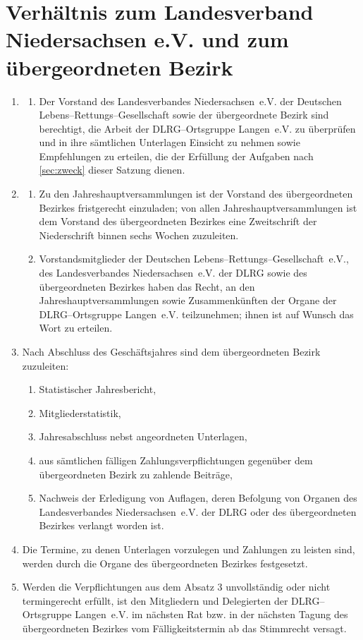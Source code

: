\documentclass[%
12pt, %
a4paper, %
headsepline, %
parskip, %
headings=normal, %
]{scrreprt}
\begin{document}
\section{Verhältnis zum Landesverband Niedersachsen e.V. und zum übergeordneten Bezirk}
\label{sec:verhaeltnis}
\begin{enumerate}
    \item \begin{enumerate}[noitemsep]
        \item Der Vorstand des Landesverbandes Niedersachsen~e.V. der Deutschen Lebens--Rettungs--Gesellschaft sowie der übergeordnete Bezirk sind berechtigt, die Arbeit der DLRG--Ortsgruppe Langen~e.V. zu überprüfen und in ihre sämtlichen Unterlagen Einsicht zu nehmen sowie Empfehlungen zu erteilen, die der Erfüllung der Aufgaben nach \ref{sec:zweck} dieser Satzung dienen.
      \end{enumerate}
    \item \begin{enumerate}[noitemsep]
        \item Zu den Jahreshauptversammlungen ist der Vorstand des übergeordneten Bezirkes fristgerecht einzuladen; von allen Jahreshauptversammlungen ist dem Vorstand des übergeordneten Bezirkes eine Zweitschrift der Niederschrift binnen sechs Wochen zuzuleiten.
        \item Vorstandsmitglieder der Deutschen Lebens--Rettungs--Gesellschaft~e.V., des Landesverbandes Niedersachsen~e.V. der DLRG sowie des übergeordneten Bezirkes haben das Recht, an den Jahreshauptversammlungen sowie Zusammenkünften der Organe der DLRG--Ortsgruppe Langen~e.V. teilzunehmen; ihnen ist auf Wunsch das Wort zu erteilen.
      \end{enumerate}
    \item Nach Abschluss des Geschäftsjahres sind dem übergeordneten Bezirk zuzuleiten: \begin{enumerate}[noitemsep]
        \item Statistischer Jahresbericht,
        \item Mitgliederstatistik,
        \item Jahresabschluss nebst angeordneten Unterlagen,
        \item aus sämtlichen fälligen Zahlungsverpflichtungen gegenüber dem übergeordneten Bezirk zu zahlende Beiträge,
        \item Nachweis der Erledigung von Auflagen, deren Befolgung von Organen des Landesverbandes Niedersachsen~e.V. der DLRG oder des übergeordneten Bezirkes verlangt worden ist.
      \end{enumerate}
    \item Die Termine, zu denen Unterlagen vorzulegen und Zahlungen zu leisten sind, werden durch die Organe des übergeordneten Bezirkes festgesetzt.
    \item Werden die Verpflichtungen aus dem Absatz 3 unvollständig oder nicht termingerecht erfüllt, ist den Mitgliedern und Delegierten der DLRG--Ortsgruppe Langen~e.V. im nächsten Rat bzw. in der nächsten Tagung des übergeordneten Bezirkes vom Fälligkeitstermin ab das Stimmrecht versagt.
\end{enumerate}
\end{document}
